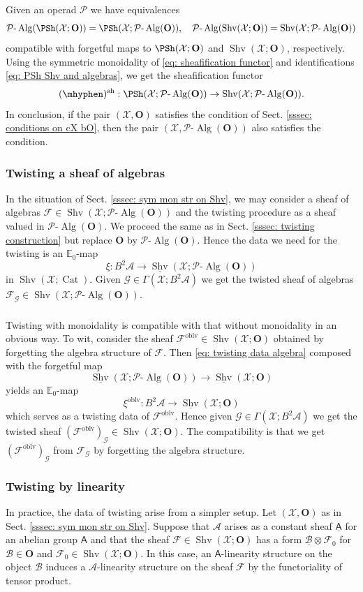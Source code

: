 \documentclass[10pt]{amsart}
\newcommand{\sssec}{\subsubsection}
\theoremstyle{remark}
\newcommand{\ul}{\underline}
\newcommand{\E}{\mathbb{E}}
\newcommand{\cP}{\mathcal{P}}
\newcommand{\on}{\operatorname}
\newcommand{\cA}{\mathcal{A}}
\newcommand{\cB}{\mathcal{B}}
\newcommand{\cF}{\mathcal{F}}
\newcommand{\cG}{\mathcal{G}}
\newcommand{\cX}{\mathcal{X}}
\newcommand{\Cat}{\on{Cat}}
\newcommand{\lAlg}{\text{-}\on{Alg}}
\newcommand{\Shv}{\on{Shv}}
\newcommand{\bO}{\mathbf{O}}
\newcommand{\sfA}{\mathsf{A}}
\begin{document}
Given an operad $\cP$ we have equivalences
\begin{equation}\label{eq: PSh Shv and algebras}
    \cP\lAlg(\PSh(\cX;\bO))=\PSh(\cX;\cP\lAlg(\bO)),\quad \cP\lAlg(\Shv(\cX;\bO))=\Shv(\cX;\cP\lAlg(\bO))
\end{equation}
 compatible with forgetful maps to $\PSh(\cX;\bO)$ and $\Shv(\cX;\bO)$, respectively. Using the symmetric monoidality of \eqref{eq: sheafification functor} and identifications \eqref{eq: PSh Shv and algebras}, we get the sheafification functor
\[(\mhyphen)^{\on{sh}}:\PSh(\cX;\cP\lAlg(\bO))\rightarrow \Shv(\cX;\cP\lAlg(\bO)).\]
 In conclusion, if the pair $(\cX,\bO)$ satisfies the condition of Sect. \ref{sssec: conditions on cX bO}, then the pair $(\cX,\cP\lAlg(\bO))$ also satisfies the condition.
 
 


\sssec{Twisting a sheaf of algebras}\label{sssec: twisting algebra construction}
In the situation of Sect. \ref{sssec: sym mon str on Shv}, we may consider a sheaf of algebras $\cF\in \Shv(\cX;\cP\lAlg(\bO))$ and the twisting procedure as a sheaf valued in $\cP\lAlg(\bO)$. We proceed the same as in Sect. \ref{sssec: twisting construction} but replace $\bO$ by $\cP\lAlg(\bO)$. Hence the data we need for the twisting is an $\E_0$-map
\begin{equation}\label{eq: twisting data algebra}
    \xi:B^2\cA\rightarrow \ul{\Shv}(\cX;\cP\lAlg(\bO))
\end{equation}
in $\Shv(\cX;\Cat)$. Given $\cG\in\Gamma(\cX;B^2\cA)$ we get the twisted sheaf of algebras $\cF_{\cG}\in\Shv(\cX;\cP\lAlg(\bO))$.

\sssec{}\label{sssec: twisting and forgetting}
Twisting with monoidality is compatible with that without monoidality in an obvious way. To wit, consider the sheaf
$\cF^{\on{oblv}}\in\Shv(\cX;\bO)$ obtained by forgetting the algebra structure of $\cF$. Then
 \eqref{eq: twisting data algebra} composed with the forgetful map
\[\ul{\Shv}(\cX;\cP\lAlg(\bO))\rightarrow \ul{\Shv}(\cX;\bO)\]
yields an $\E_0$-map
\[\xi^{\on{oblv}}: B^2\cA\rightarrow \ul{\Shv}(\cX;\bO)\]
which serves as a twisting data of $\cF^{\on{oblv}}$. Hence given $\cG\in\Gamma(\cX;B^2\cA)$ we get the twisted sheaf $(\cF^{\on{oblv}})_{\cG}\in\Shv(\cX;\bO)$. The compatibility is that we get $(\cF^{\on{oblv}})_{\cG}$ from $\cF_{\cG}$ by forgetting the algebra structure.



\sssec{Twisting by linearity}\label{sssec: twisting by linearity}
In practice, the data of twisting arise from a simpler setup. Let $(\cX,\bO)$ as in Sect. \ref{sssec: sym mon str on Shv}. Suppose that $\cA$ arises as a constant sheaf $\ul{\sfA}$ for an abelian group $\sfA$ and that the sheaf $\cF\in\Shv(\cX;\bO)$ has a form $\ul{\cB}\otimes \cF_0$ for $\cB\in\bO$ and $\cF_0\in \Shv(\cX;\bO)$. In this case, an $\sfA$-linearity structure on the object $\cB$ induces a $\cA$-linearity structure on the sheaf $\cF$ by the functoriality of tensor product.
\medskip
\end{document}
